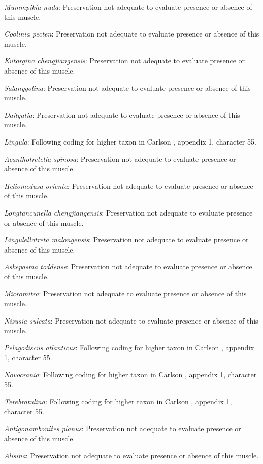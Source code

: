 \documentclass[openany]{book}
\theoremstyle{definition}
\theoremstyle{definition}
\theoremstyle{definition}
\theoremstyle{remark}
\begin{document}
\emph{Mummpikia nuda}: Preservation not adequate to evaluate presence or
absence of this muscle.

\emph{Coolinia pecten}: Preservation not adequate to evaluate presence
or absence of this muscle.

\emph{Kutorgina chengjiangensis}: Preservation not adequate to evaluate
presence or absence of this muscle.

\emph{Salanygolina}: Preservation not adequate to evaluate presence or
absence of this muscle.

\emph{Dailyatia}: Preservation not adequate to evaluate presence or
absence of this muscle.

\emph{Lingula}: Following coding for higher taxon in Carlson
\citeyearpar{Carlson1995Phylogeneticrelationships}, appendix 1,
character 55.

\emph{Acanthotretella spinosa}: Preservation not adequate to evaluate
presence or absence of this muscle.

\emph{Heliomedusa orienta}: Preservation not adequate to evaluate
presence or absence of this muscle.

\emph{Longtancunella chengjiangensis}: Preservation not adequate to
evaluate presence or absence of this muscle.

\emph{Lingulellotreta malongensis}: Preservation not adequate to
evaluate presence or absence of this muscle.

\emph{Askepasma toddense}: Preservation not adequate to evaluate
presence or absence of this muscle.

\emph{Micromitra}: Preservation not adequate to evaluate presence or
absence of this muscle.

\emph{Nisusia sulcata}: Preservation not adequate to evaluate presence
or absence of this muscle.

\emph{Pelagodiscus atlanticus}: Following coding for higher taxon in
Carlson \citeyearpar{Carlson1995Phylogeneticrelationships}, appendix 1,
character 55.

\emph{Novocrania}: Following coding for higher taxon in Carlson
\citeyearpar{Carlson1995Phylogeneticrelationships}, appendix 1,
character 55.

\emph{Terebratulina}: Following coding for higher taxon in Carlson
\citeyearpar{Carlson1995Phylogeneticrelationships}, appendix 1,
character 55.

\emph{Antigonambonites planus}: Preservation not adequate to evaluate
presence or absence of this muscle.

\emph{Alisina}: Preservation not adequate to evaluate presence or
absence of this muscle.
\end{document}
